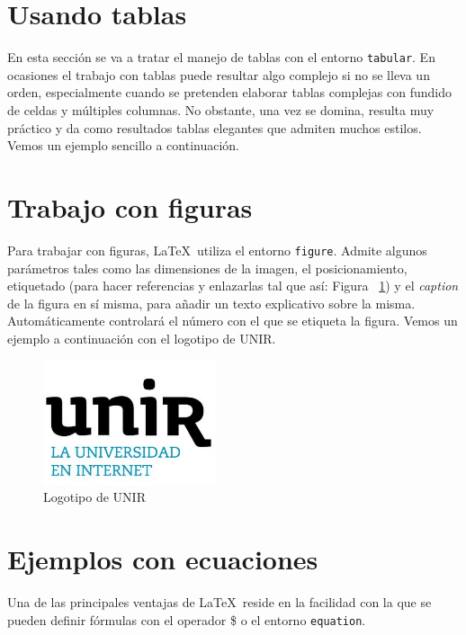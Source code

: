 \documentclass[review]{elsarticle}
\begin{document}
\section{Usando tablas}

En esta sección se va a tratar el manejo de tablas con el entorno \texttt{tabular}. En ocasiones el trabajo con tablas puede resultar algo complejo si no se lleva un orden, especialmente cuando se pretenden elaborar tablas complejas con fundido de celdas y múltiples columnas. No obstante, una vez se domina, resulta muy práctico y da como resultados tablas elegantes que admiten muchos estilos. Vemos un ejemplo sencillo a continuación. 



\section{Trabajo con figuras}

Para trabajar con figuras, \LaTeX\ utiliza el entorno \texttt{figure}. Admite algunos parámetros tales como las dimensiones de la imagen, el posicionamiento, etiquetado (para hacer referencias y enlazarlas tal que así: Figura ~\ref{fig:unir}) y el \textit{caption} de la figura en sí misma, para añadir un texto explicativo sobre la misma. Automáticamente controlará el número con el que se etiqueta la figura. Vemos un ejemplo a continuación con el logotipo de UNIR. 

\begin{figure}[!h]
  \begin{center}
    \includegraphics[width=0.45\textwidth]{figures/unir.jpg} 
    \caption{Logotipo de UNIR}
    \label{fig:unir}
  \end{center}
\end{figure}

\section{Ejemplos con ecuaciones}

Una de las principales ventajas de \LaTeX\ reside en la facilidad con la que se pueden definir fórmulas con el operador \$ o el entorno \texttt{equation}.
\end{document}

